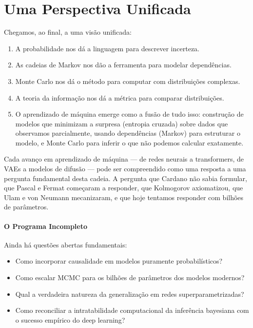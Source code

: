 \documentclass{tufte-handout}
\begin{document}
\section{Uma Perspectiva Unificada}

Chegamos, ao final, a uma visão unificada:

\begin{enumerate}
    \item A probabilidade nos dá a linguagem para descrever incerteza.
    \item As cadeias de Markov nos dão a ferramenta para modelar dependências.
    \item Monte Carlo nos dá o método para computar com distribuições complexas.
    \item A teoria da informação nos dá a métrica para comparar distribuições.
    \item O aprendizado de máquina emerge como a fusão de tudo isso: construção de
    modelos que minimizam a surpresa (entropia cruzada) sobre dados que observamos
    parcialmente, usando dependências (Markov) para estruturar o modelo, e Monte Carlo
    para inferir o que não podemos calcular exatamente.
\end{enumerate}

Cada avanço em aprendizado de máquina --- de redes neurais a transformers, de VAEs a
modelos de difusão --- pode ser compreendido como uma resposta a uma pergunta
fundamental desta cadeia. A pergunta que Cardano não sabia formular, que Pascal e Fermat
começaram a responder, que Kolmogorov axiomatizou, que Ulam e von Neumann mecanizaram,
e que hoje tentamos responder com bilhões de parâmetros.

\paragraph{O Programa Incompleto}

Ainda há questões abertas fundamentais:
\begin{itemize}
    \item Como incorporar causalidade em modelos puramente probabilísticos?
    \item Como escalar MCMC para os bilhões de parâmetros dos modelos modernos?
    \item Qual a verdadeira natureza da generalização em redes superparametrizadas?
    \item Como reconciliar a intratabilidade computacional da inferência bayesiana
    com o sucesso empírico do deep learning?
\end{itemize}
\end{document}
